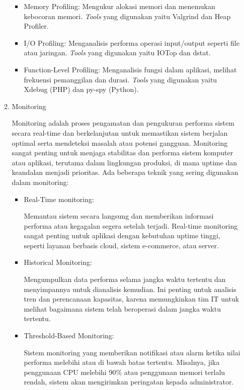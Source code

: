 \documentclass[12pt]{article}
\begin{document}
\begin{enumerate}
\begin{enumerate}
\begin{itemize}
        \item Memory Profiling: Mengukur alokasi memori dan menemukan kebocoran memori. \textit{Tools} yang digunakan yaitu Valgrind dan Heap Profiler.
        \item I/O Profiling: Menganalisis performa operasi input/output seperti file atau jaringan. \textit{Tools} yang digunakan yaitu IOTop dan dstat.
        \item Function-Level Profiling: Menganalisis fungsi dalam aplikasi, melihat frekuensi pemanggilan dan durasi. \textit{Tools} yang digunakan yaitu Xdebug (PHP) dan py-spy (Python).
    \end{itemize}
    \item Monitoring
    \par Monitoring adalah proses pengamatan dan pengukuran performa sistem secara real-time dan berkelanjutan untuk memastikan sistem berjalan optimal serta mendeteksi masalah atau potensi gangguan. Monitoring sangat penting untuk menjaga stabilitas dan performa sistem komputer atau aplikasi, terutama dalam lingkungan produksi, di mana uptime dan keandalan menjadi prioritas. Ada beberapa teknik yang sering digunakan dalam monitoring:
    \begin{itemize}
        \item Real-Time monitoring:
        \par Memantau sistem secara langsung dan memberikan informasi performa atau kegagalan segera setelah terjadi. Real-time monitoring sangat penting untuk aplikasi dengan kebutuhan uptime tinggi, seperti layanan berbasis cloud, sistem e-commerce, atau server.
        \item Historical Monitoring:
        \par Mengumpulkan data performa selama jangka waktu tertentu dan menyimpannya untuk dianalisis kemudian. Ini penting untuk analisis tren dan perencanaan kapasitas, karena memungkinkan tim IT untuk melihat bagaimana sistem telah beroperasi dalam jangka waktu tertentu.
        \item Threshold-Based Monitoring:
        \par Sistem monitoring yang memberikan notifikasi atau alarm ketika nilai performa melebihi atau di bawah batas tertentu. Misalnya, jika penggunaan CPU melebihi 90\% atau penggunaan memori terlalu rendah, sistem akan mengirimkan peringatan kepada administrator.
    \end{itemize}
    \begin{table}[htbp]
    \centering
        \begin{tabular}{|p{2cm}|p{3cm}|p{3cm}|p{3cm}|}

\end{tabular}
\end{table}
\end{enumerate}
\end{enumerate}
\end{document}
